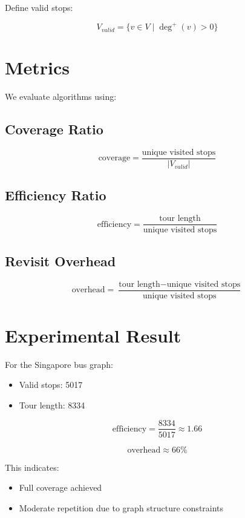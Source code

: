 \documentclass[11pt]{article}
\begin{document}
Define valid stops:

\[
V_{valid} = \{ v \in V \mid \deg^{+}(v) > 0 \}
\]

\section{Metrics}

We evaluate algorithms using:

\subsection*{Coverage Ratio}

\[
\text{coverage} = \frac{\text{unique visited stops}}{|V_{valid}|}
\]

\subsection*{Efficiency Ratio}

\[
\text{efficiency} = \frac{\text{tour length}}{\text{unique visited stops}}
\]

\subsection*{Revisit Overhead}

\[
\text{overhead} = \frac{\text{tour length} - \text{unique visited stops}}{\text{unique visited stops}}
\]

\section{Experimental Result}

For the Singapore bus graph:

\begin{itemize}
    \item Valid stops: 5017
    \item Tour length: 8334
\end{itemize}

\[
\text{efficiency} = \frac{8334}{5017} \approx 1.66
\]

\[
\text{overhead} \approx 66\%
\]

This indicates:

\begin{itemize}
    \item Full coverage achieved
    \item Moderate repetition due to graph structure constraints
\end{itemize}
\end{document}
